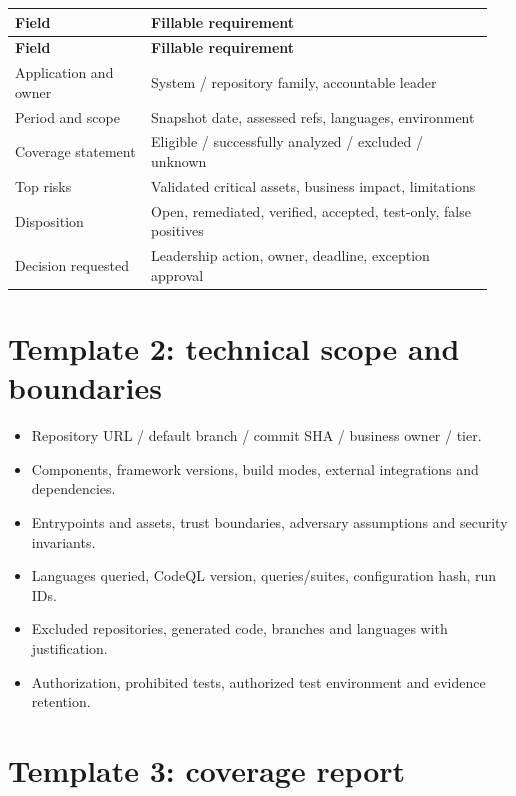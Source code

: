 \documentclass[11pt,letterpaper,oneside]{book}
\begin{document}
\small
\setlength{\tabcolsep}{2pt}
\renewcommand{\arraystretch}{1.18}
\begin{longtable}{>{\raggedright\arraybackslash}p{0.27\linewidth}>{\raggedright\arraybackslash}p{0.68\linewidth}}
\toprule
\textbf{Field} & \textbf{Fillable requirement}\\
\midrule
\endfirsthead
\toprule
\textbf{Field} & \textbf{Fillable requirement}\\
\midrule
\endhead
Application and owner & System / repository family, accountable leader\\
Period and scope & Snapshot date, assessed refs, languages, environment\\
Coverage statement & Eligible / successfully analyzed / excluded / unknown\\
Top risks & Validated critical assets, business impact, limitations\\
Disposition & Open, remediated, verified, accepted, test-only, false positives\\
Decision requested & Leadership action, owner, deadline, exception approval\\
\bottomrule
\end{longtable}
\normalsize

\section{Template 2: technical scope and boundaries}

\begin{itemize}
\item Repository URL / default branch / commit SHA / business owner / tier.
\item Components, framework versions, build modes, external integrations and dependencies.
\item Entrypoints and assets, trust boundaries, adversary assumptions and security invariants.
\item Languages queried, CodeQL version, queries/suites, configuration hash, run IDs.
\item Excluded repositories, generated code, branches and languages with justification.
\item Authorization, prohibited tests, authorized test environment and evidence retention.
\end{itemize}

\section{Template 3: coverage report}
\end{document}

